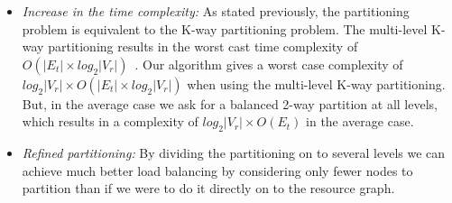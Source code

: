 \begin{itemize}

\item \textit{Increase in the time complexity:} As stated previously,
  the partitioning problem is equivalent to the K-way partitioning
  problem. The multi-level K-way partitioning results in the worst cast
  time complexity of $O(|E_t| \times log_2|V_r|)$~\cite{gkar98}. Our
  algorithm gives a worst case complexity of \mbox{$log_2|V_r| \times
    O(|E_t| \times log_2 |V_r|)$} when using the multi-level K-way
  partitioning. But, in the average case we ask for a balanced 2-way
  partition at all levels, which results in a complexity of $log_2 |V_r|
  \times O (E_t)$ in the average case.

\item \textit{Refined partitioning:} By dividing the partitioning on to several
  levels we can achieve much better load balancing by considering only
  fewer nodes to partition than if we were to do it directly on to the
  resource graph. %

\end{itemize}


